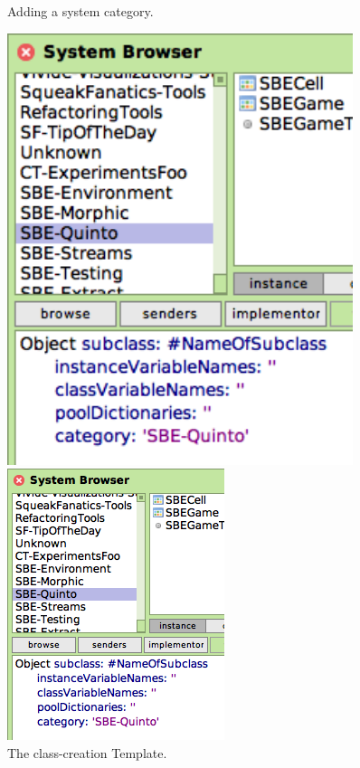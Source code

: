 \documentclass[a4paper,10pt,twoside]{book}
\begin{document}
\begin{figure}[htb]
\begin{minipage}[b]{0.48\textwidth}
	\caption{Adding a system category.
	\label{fig:addCategory}}
\end{minipage}
\hfill
\begin{minipage}[b]{0.48\textwidth}
\ifluluelse
	{\centerline {\includegraphics[width=0.9\textwidth]{ClassTemplate}}}
	{\centerline {\includegraphics[scale=0.7]{ClassTemplate}}}
	\caption{The class-creation Template.
	\label{fig:classTemplate}}
\end{minipage}
\end{figure}
\end{document}
